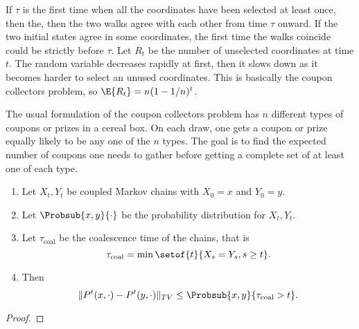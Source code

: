 \documentclass[12pt]{article}
\begin{document}
If \( \tau \) is the first time when all the coordinates have been
selected at least once, then the, then the two walks agree with each
other from time \( \tau \) onward.  If the two initial states agree in
some coordinates, the first time the walks coincide could be strictly
before \( \tau \).  Let \( R_t \) be the number of unselected
coordinates at time \( t \).  The random variable decreases rapidly at
first, then it slows down as it becomes harder to select an unused
coordinates.  This is basically the coupon collectors problem, so \( \E{R_t}
= n(1 - 1/n)^t \).

\begin{remark}
    The usual formulation of the coupon collectors problem%
    has \( n \) different types of coupons or prizes in a cereal box.
    On each draw, one gets a coupon or prize equally likely to be any
    one of the \( n \) types.  The goal is to find the expected number
    of coupons one needs to gather before getting a complete set of at
    least one of each type.
\end{remark}

\begin{theorem}
    \begin{enumerate}
        \item
            Let \( X_t, Y_t \) be coupled Markov chains with \( X_0 = x \)
            and \( Y_0 = y \).
        \item
            Let \( \Probsub{x,y}{\cdot} \) be the probability
            distribution for \( X_t, Y_t \).
        \item
            Let \( \tau_{\text{coal}} \) be the coalescence time of the
            chains, that is
            \[
                \tau_{\text{coal}} = \min \setof{t}{X_s = Y_s, s \ge t}.
            \]
        \item
            Then
            \[
                \| P^t(x, \cdot) - P^t(y,\cdot)\|_{TV} \le \Probsub{x,y}
                {\tau_{\text{coal}} > t}.
            \]
    \end{enumerate}
\end{theorem}

\begin{proof}
\end{proof}
\end{document}
